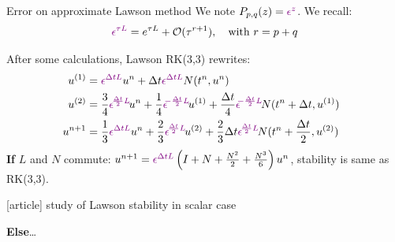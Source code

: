 \documentclass{beamer}
\newcommand{\mbold}[1]{{\textbf{\color{PLB}#1}}}
\newcommand{\customcite}[1]{\cite{#1}}
\begin{document}
\newcommand{\pexp}[1]{\textcolor{violet}{ \epsilon^{#1} }}
\begin{frame}{Error on approximate Lawson method}
  We note $P_{p,q}(z) = \pexp{z}$.
  We recall: $$\pexp{\tau L} = e^{\tau L} + \mathcal{O}(\tau^{r+1}),\quad\text{with}\ r=p+q$$

  After some calculations, Lawson RK(3,3) rewrites:
  $$
    \begin{aligned}
      \!\!\!\!u^{(1)} &= \pexp{\Delta t L}u^n + \Delta t\pexp{\Delta t L}N(t^n,u^n) \\
      \!\!\!\!u^{(2)} &= \frac{3}{4}\pexp{\!\frac{\Delta t}{2} L\!}u^n + \frac{1}{4}\pexp{\!\!-\frac{\Delta t}{2} L\!}u^{(1)} + \frac{\Delta t}{4}\pexp{\!\!-\frac{\Delta t}{2} L\!} N(t^n+\Delta t,u^{(1)}) \\
      \!\!\!\!u^{n+1} &= \frac{1}{3}\pexp{\Delta t L}u^n + \frac{2}{3}\pexp{\!\frac{\Delta t}{2} L\!}u^{(2)} + \frac{2}{3}\Delta t \pexp{\!\frac{\Delta t}{2} L\!} N(t^n+\frac{\Delta t}{2},u^{(2)})
    \end{aligned}
  $$
  \mbold{If} $L$ and $N$ commute: $u^{n+1} = \pexp{\Delta tL}\left(I + N + \frac{N^2}{2} + \frac{N^3}{6} \right)u^n$, stability is same as RK(3,3).
  \begin{thebibliography}{9}
    [article]
     \customcite{Crouseilles:2019b} \textcolor{defaultcolor}{study of Lawson stability in scalar case}
  \end{thebibliography}
   \mbold{Else}\dots

\end{frame}
\end{document}
